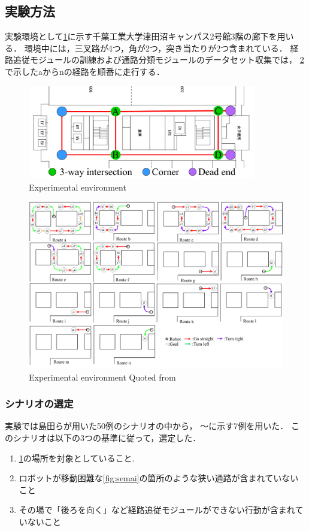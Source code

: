 \subsection{実験方法}
実験環境として\ref{fig:cit3f}に示す千葉工業大学津田沼キャンパス2号館3階の廊下を用いる．
環境中には，三叉路が4つ，角が2つ，突き当たりが2つ含まれている．
経路追従モジュールの訓練および通路分類モジュールのデータセット収集では，
\ref{fig:newroute}で示したaからnの経路を順番に走行する．
\begin{figure}[htbp]
    \centering
     \includegraphics[width=100mm]{images/pdf/cit3f.pdf}
     \caption{Experimental environment \cite{haruyama2023}}\label{fig:cit3f}
\end{figure}
\begin{figure}[htbp]
    \centering
     \includegraphics[width=130mm]{images/pdf/newroute.pdf}
     \caption{Experimental environment Quoted from \cite{haruyama2023}}\label{fig:newroute}
\end{figure}


\subsubsection{シナリオの選定}
実験では島田らが用いた50例のシナリオの中から，
〜に示す7例を用いた．
このシナリオは以下の3つの基準に従って，選定した．
\begin{enumerate}
    \item [1）] \ref{fig:cit3f}の場所を対象としていること.
    \item [2）] ロボットが移動困難な\ref{fig:semai}の箇所のような狭い通路が含まれていないこと
    \item [3）] その場で「後ろを向く」など経路追従モジュールができない行動が含まれていないこと
\end{enumerate}

